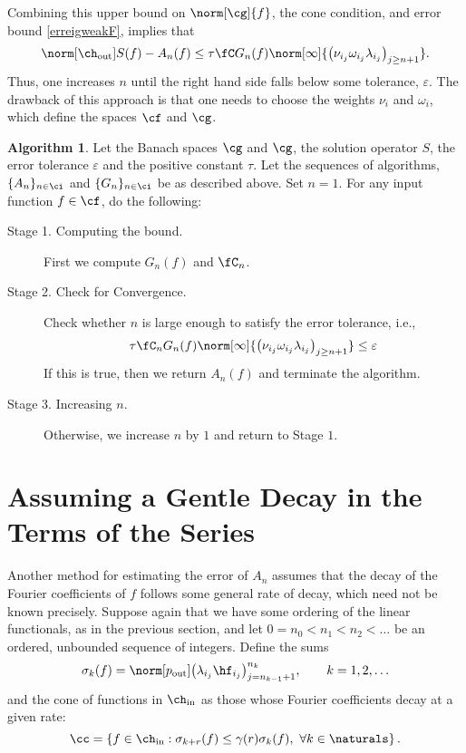 \documentclass[final]{elsarticle}
\newcommand{\chin}{\ch_{\text{\rm{in}}}}
\newcommand{\chout}{\ch_{\text{\rm{out}}}}
\newcommand{\pout}{p_{\text{\rm{out}}}}
\theoremstyle{definition}
\newtheorem{algo}{Algorithm}
\theoremstyle{remark}
\begin{document}
Combining this upper bound on $\norm[\cg]{f}$, the cone condition, and error bound \eqref{erreigweakF}, implies that
\begin{equation*}
\norm[\chout]{S(f)-A_n(f)} \le \tau \fC G_n(f) \norm[\infty]{\left(\nu_{i_j} \omega_{i_j} \lambda_{i_j} \right)_{j\ge n+1}}.
\end{equation*}
Thus, one increases $n$ until the right hand side falls below some tolerance, $\varepsilon$.  The drawback of this approach is that one needs to choose the weights $\nu_i$ and $\omega_i$, which define the spaces $\cf$ and $\cg$.

\begin{algo}\label{algo1}
 Let the Banach spaces $\cg$ and $\cg$, the solution operator $S$, the error tolerance $\varepsilon$ and the positive constant $\tau$. Let the sequences of algorithms, $\{A_n\}_{n\in\ci}$ and $\{G_n\}_{n\in\ci}$ be as described above. Set $n=1$. For any input function $f\in\cf$, do the following:
\begin{description}
\item[Stage 1. Computing the bound.] First we compute $G_n(f)$ and $\fC_n$.
\item[Stage 2. Check for Convergence.] Check whether $n$ is large enough to satisfy the error tolerance, i.e.,
    \begin{equation}
          \tau \fC_n G_n(f) \norm[\infty]{\left(\nu_{i_j} \omega_{i_j} \lambda_{i_j} \right)_{j\ge n+1}} \le \varepsilon
    \end{equation}
    If this is true, then we return $A_n(f)$ and terminate the algorithm.
\item[Stage 3. Increasing $n$.] Otherwise, we increase $n$ by $1$ and return to Stage $1$.
\end{description}
\end{algo}



\section{Assuming a Gentle Decay in the Terms of the Series}

Another method for estimating the error of $A_n$ assumes that the decay of the Fourier coefficients of $f$ follows some general rate of decay, which need not be known precisely.  Suppose again that we have some ordering of the linear functionals, as in the previous section, and let $0=n_0 < n_1 < n_2 < \ldots$ be an ordered, unbounded sequence of integers.  Define the sums
\begin{equation} \label{sumdef}
\sigma_k(f) = \norm[\pout]{ \left(\lambda_{i_j} \hf_{i_j} \right)_{j=n_{k-1}+1}^{n_k}}, \qquad k=1, 2, \ldots
\end{equation}
and the cone of functions in $\chin$ as those whose Fourier coefficients decay at a given rate:
\begin{equation} \label{decayconedef}
\cc = \left\{ f \in \chin : \sigma_{k+r}(f) \le \gamma(r) \sigma_k (f), \ \forall k \in \naturals \right\}.
\end{equation}
\end{document}
